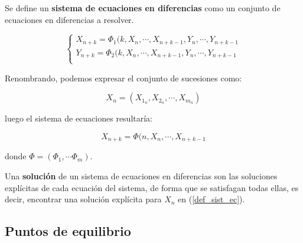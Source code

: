 \begin{definition}
Se define un \textbf{sistema de ecuaciones en diferencias} como un conjunto de ecuaciones en diferencias a resolver.

\begin{equation}
\begin{cases}
X_{n+k} = \Phi_1(k, X_n, \cdots , X_{n+k-1}, Y_n, \cdots, Y_{n+k-1} \\
Y_{n+k} = \Phi_2(k, X_n, \cdots , X_{n+k-1}, Y_n, \cdots, Y_{n+k-1} \\
\end{cases}
\end{equation}

Renombrando, podemos expresar el conjunto de sucesiones como:

\begin{equation}
X_n = (X_{1_n}, X_{2_n}, \cdots , X_{m_n})
\end{equation}

luego el sistema de ecuaciones resultaría:

\begin{equation}
\label{def_sist_ec}
X_{n+k} = \Phi (n, X_n, \cdots , X_{n+k-1}
\end{equation}


donde $\Phi = (\Phi_1, \cdots \Phi_m)$.

\end{definition}

\begin{definition}
Una \textbf{solución} de un sistema de ecuaciones en diferencias son las soluciones explícitas de cada ecuación del sistema, de forma que se satisfagan todas ellas, es decir, encontrar una solución explícita para $X_n$ en (\ref{def_sist_ec}).
\end{definition}

\subsection{Puntos de equilibrio}

